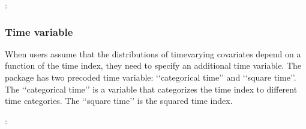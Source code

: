 \documentclass[letterpaper,10pt,english]{sphinxmanual}
\begin{document}
\begin{sphinxVerbatim}[commandchars=\\\{\}]
        
         
      
      \PYG{p}{[} \PYG{p}{]}
      \PYG{p}{[} \PYG{p}{]}
      
\end{sphinxVerbatim}

\sphinxAtStartPar
{}:
\begin{quote}

\end{quote}


\subsubsection{Time variable}
\label{\detokenize{Specifications/Covariate model:time-variable}}
\sphinxAtStartPar
When users assume that the distributions of time\sphinxhyphen{}varying covariates
depend on a function of the time index, they need to specify an additional time variable. The package has two pre\sphinxhyphen{}coded
time variable: ‘‘categorical time’’ and ‘‘square time’’.
The ‘‘categorical time’’ is a variable that categorizes the time index to different time categories. The ‘‘square time’’
is the squared time index.

\sphinxAtStartPar
{}:
\end{document}
